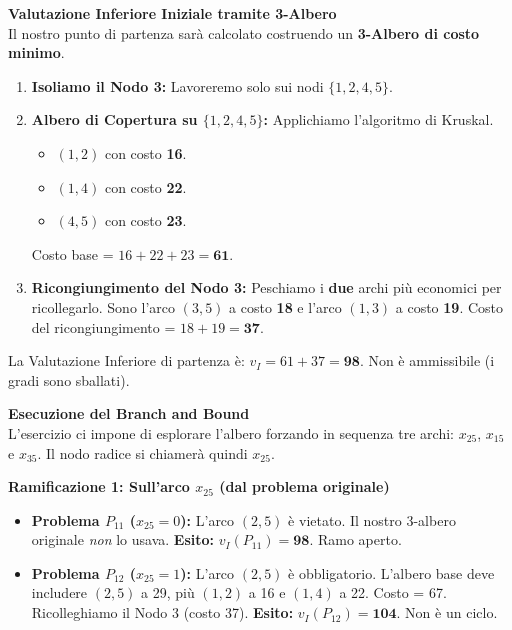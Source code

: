 \documentclass[12pt, a4paper]{article}
\begin{document}
	\vspace{0.4cm}
	\textbf{Valutazione Inferiore Iniziale tramite 3-Albero}\\
	Il nostro punto di partenza sarà calcolato costruendo un \textbf{3-Albero di costo minimo}. 
	\begin{enumerate}
		\item \textbf{Isoliamo il Nodo 3:} Lavoreremo solo sui nodi $\{1, 2, 4, 5\}$.
		\item \textbf{Albero di Copertura su $\{1, 2, 4, 5\}$:} Applichiamo l'algoritmo di Kruskal. 
		\begin{itemize}[label=$\circ$, itemsep=1pt, leftmargin=1.5cm]
			\item $(1,2)$ con costo \textbf{16}.
			\item $(1,4)$ con costo \textbf{22}.
			\item $(4,5)$ con costo \textbf{23}.
		\end{itemize}
		Costo base = $16 + 22 + 23 = \mathbf{61}$.
		\item \textbf{Ricongiungimento del Nodo 3:} Peschiamo i \textbf{due} archi più economici per ricollegarlo. Sono l'arco $(3,5)$ a costo \textbf{18} e l'arco $(1,3)$ a costo \textbf{19}. 
		Costo del ricongiungimento = $18 + 19 = \mathbf{37}$.
	\end{enumerate}
	
	La Valutazione Inferiore di partenza è: $v_I = 61 + 37 = \mathbf{98}$. Non è ammissibile (i gradi sono sballati).
	
	\vspace{0.4cm}
	\textbf{Esecuzione del Branch and Bound}\\
	L'esercizio ci impone di esplorare l'albero forzando in sequenza tre archi: $x_{25}$, $x_{15}$ e $x_{35}$. Il nodo radice si chiamerà quindi $x_{25}$.
	
	\textbf{Ramificazione 1: Sull'arco $x_{25}$ (dal problema originale)}\\
	\begin{itemize}[label=\textcolor{titlecolor}{\Large\textbullet}, itemsep=2pt, leftmargin=1.5cm]
		\item \textbf{Problema $P_{11}$ ($x_{25} = 0$):} L'arco $(2,5)$ è vietato. Il nostro 3-albero originale \textit{non} lo usava.
		\textbf{Esito:} $v_I(P_{11}) = \mathbf{98}$. Ramo aperto.
		\item \textbf{Problema $P_{12}$ ($x_{25} = 1$):} L'arco $(2,5)$ è obbligatorio. 
		L'albero base deve includere $(2,5)$ a 29, più $(1,2)$ a 16 e $(1,4)$ a 22. Costo = 67.
		Ricolleghiamo il Nodo 3 (costo 37). \textbf{Esito:} $v_I(P_{12}) = \mathbf{104}$. Non è un ciclo.
	\end{itemize}
	
\end{document}
